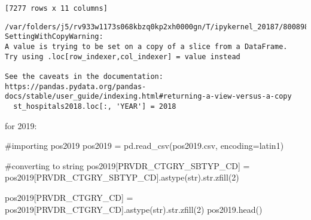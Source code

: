 \documentclass[
  letterpaper,
  DIV=11,
  numbers=noendperiod]{scrartcl}
\newenvironment{Shaded}{\begin{snugshade}}{\end{snugshade}}
\newcommand{\BuiltInTok}[1]{\textcolor[rgb]{0.00,0.23,0.31}{#1}}
\newcommand{\CommentTok}[1]{\textcolor[rgb]{0.37,0.37,0.37}{#1}}
\newcommand{\DecValTok}[1]{\textcolor[rgb]{0.68,0.00,0.00}{#1}}
\newcommand{\NormalTok}[1]{\textcolor[rgb]{0.00,0.23,0.31}{#1}}
\newcommand{\OperatorTok}[1]{\textcolor[rgb]{0.37,0.37,0.37}{#1}}
\newcommand{\StringTok}[1]{\textcolor[rgb]{0.13,0.47,0.30}{#1}}
\begin{document}
\begin{verbatim}
[7277 rows x 11 columns]
\end{verbatim}

\begin{verbatim}
/var/folders/j5/rv933w1173s068kbzq0kp2xh0000gn/T/ipykernel_20187/800898756.py:2: SettingWithCopyWarning: 
A value is trying to be set on a copy of a slice from a DataFrame.
Try using .loc[row_indexer,col_indexer] = value instead

See the caveats in the documentation: https://pandas.pydata.org/pandas-docs/stable/user_guide/indexing.html#returning-a-view-versus-a-copy
  st_hospitals2018.loc[:, 'YEAR'] = 2018
\end{verbatim}

for 2019:

\begin{Shaded}
\begin{Highlighting}[]
\CommentTok{\#importing pos2019}
\NormalTok{pos2019 }\OperatorTok{=}\NormalTok{ pd.read\_csv(}\StringTok{\textquotesingle{}pos2019.csv\textquotesingle{}}\NormalTok{, encoding}\OperatorTok{=}\StringTok{\textquotesingle{}latin1\textquotesingle{}}\NormalTok{)}
\end{Highlighting}
\end{Shaded}

\begin{Shaded}
\begin{Highlighting}[]
\CommentTok{\#converting to string}
\NormalTok{pos2019[}\StringTok{\textquotesingle{}PRVDR\_CTGRY\_SBTYP\_CD\textquotesingle{}}\NormalTok{] }\OperatorTok{=}\NormalTok{ pos2019[}\StringTok{\textquotesingle{}PRVDR\_CTGRY\_SBTYP\_CD\textquotesingle{}}\NormalTok{].astype(}\BuiltInTok{str}\NormalTok{).}\BuiltInTok{str}\NormalTok{.zfill(}\DecValTok{2}\NormalTok{)}

\NormalTok{pos2019[}\StringTok{\textquotesingle{}PRVDR\_CTGRY\_CD\textquotesingle{}}\NormalTok{] }\OperatorTok{=}\NormalTok{ pos2019[}\StringTok{\textquotesingle{}PRVDR\_CTGRY\_CD\textquotesingle{}}\NormalTok{].astype(}\BuiltInTok{str}\NormalTok{).}\BuiltInTok{str}\NormalTok{.zfill(}\DecValTok{2}\NormalTok{)}
\NormalTok{pos2019.head()}
\end{Highlighting}
\end{Shaded}
\end{document}
